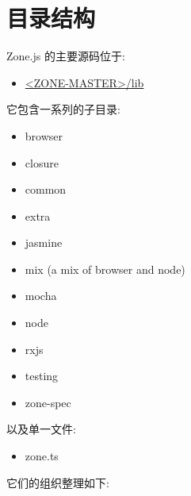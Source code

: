 \section{目录结构}


Zone.js 的主要源码位于:

\begin{itemize}
  \item \href{https://github.com/angular/zone.js/tree/master/lib/zone-spec}
        {<ZONE-MASTER>/lib}
\end{itemize}


它包含一系列的子目录:

\begin{itemize}
  \item browser
  \item closure
  \item common
  \item extra
  \item jasmine
  \item mix (a mix of browser and node)
  \item mocha
  \item node
  \item rxjs
  \item testing
  \item zone-spec
\end{itemize}


以及单一文件:

\begin{itemize}
  \item zone.ts
\end{itemize}


它们的组织整理如下:


